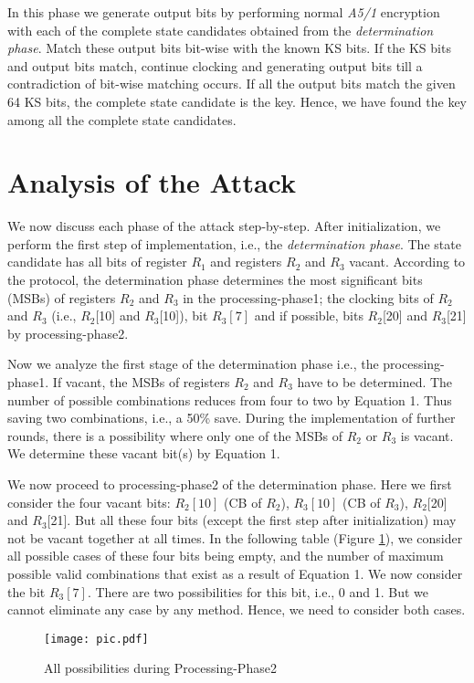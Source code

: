 \documentclass{llncs}
\begin{document}
In this phase we generate output bits by performing normal \emph{A5/1} encryption with each of the complete state candidates obtained from the \emph{determination phase}. Match these output bits bit-wise with the known KS bits. If the KS bits and output bits match, continue clocking and generating output bits till a contradiction of bit-wise matching occurs. If all the output bits match the given 64 KS bits, the complete state candidate is the key. Hence, we have found the key among all the complete state candidates.

\section{Analysis of the Attack}
We now discuss each phase of the attack step-by-step. After initialization, we perform the first step of implementation, i.e., the \emph{determination phase}. The state candidate has all bits of register $R_{1}$ and registers $R_2$ and $R_3$ vacant. According to the protocol, the determination phase determines the most significant bits (MSBs) of registers $R_{2}$ and $R_{3}$ in the processing-phase1; the clocking bits of $R_{2}$ and $R_{3}$ (i.e., $R_{2}$[10] and $R_{3}$[10]), bit $R_{3}[7]$ and if possible, bits $R_{2}$[20] and $R_{3}$[21] by processing-phase2. 

Now we analyze the first stage of the determination phase i.e., the processing-phase1. If vacant, the MSBs of registers $R_{2}$ and $R_{3}$ have to be determined. The number of possible combinations reduces from four to two by Equation 1. Thus saving two combinations, i.e., a 50\% save. During the implementation of further rounds, there is a possibility where only one of the MSBs of $R_{2}$ or $R_{3}$ is vacant. We determine these vacant bit(s) by Equation 1.

We now proceed to processing-phase2 of the determination phase. Here we first consider the four vacant bits: $R_{2}[10]$ (CB of $R_{2}$), $R_{3}[10]$ (CB of $R_{3}$), $R_{2}$[20] and $R_{3}$[21]. But all these four bits (except the first step after initialization) may not be vacant together at all times. In the following table (Figure \ref{pic}), we consider all possible cases of these four bits being empty, and the number of maximum possible valid combinations that exist as a result of Equation 1. We now consider the bit $R_{3}[7]$. There are two possibilities for this bit, i.e., 0 and 1. But we cannot eliminate any case by any method. Hence, we need to consider both cases. 

\begin{figure}[h]
\begin{center}
\texttt{[image: pic.pdf]}
\caption{All possibilities during Processing-Phase2}
\label{pic}
\end{center}
\end{figure}
\end{document}
